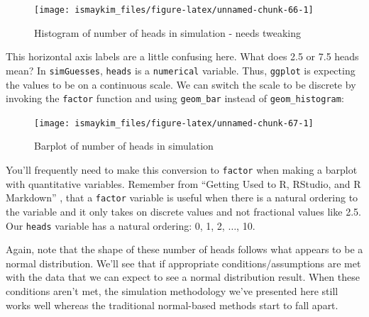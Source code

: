\documentclass[]{tufte-book}
\newenvironment{Shaded}{\begin{snugshade}}{\end{snugshade}}
\newcommand{\KeywordTok}[1]{\textcolor[rgb]{0.13,0.29,0.53}{\textbf{{#1}}}}
\newcommand{\DataTypeTok}[1]{\textcolor[rgb]{0.13,0.29,0.53}{{#1}}}
\newcommand{\StringTok}[1]{\textcolor[rgb]{0.31,0.60,0.02}{{#1}}}
\newcommand{\NormalTok}[1]{{#1}}
\begin{document}
\begin{figure}

{\centering \texttt{[image: ismaykim\_files/figure-latex/unnamed-chunk-66-1]} 

}

\caption[Histogram of number of heads in simulation - needs tweaking]{Histogram of number of heads in simulation - needs tweaking}\label{fig:unnamed-chunk-66}
\end{figure}

This horizontal axis labels are a little confusing here. What does 2.5
or 7.5 heads mean? In \texttt{simGuesses}, \texttt{heads} is a
\texttt{numerical} variable. Thus, \texttt{ggplot} is expecting the
values to be on a continuous scale. We can switch the scale to be
discrete by invoking the \texttt{factor} function and using
\texttt{geom\_bar} instead of \texttt{geom\_histogram}:

\begin{Shaded}
\end{Shaded}

\begin{figure}

{\centering \texttt{[image: ismaykim\_files/figure-latex/unnamed-chunk-67-1]} 

}

\caption[Barplot of number of heads in simulation]{Barplot of number of heads in simulation}\label{fig:unnamed-chunk-67}
\end{figure}

You'll frequently need to make this conversion to \texttt{factor} when
making a barplot with quantitative variables. Remember from ``Getting
Used to R, RStudio, and R Markdown'' \citep{usedtor2016}, that a
\texttt{factor} variable is useful when there is a natural ordering to
the variable and it only takes on discrete values and not fractional
values like 2.5. Our \texttt{heads} variable has a natural ordering: 0,
1, 2, \(\ldots\), 10.

Again, note that the shape of these number of heads follows what appears
to be a normal distribution. We'll see that if appropriate
conditions/assumptions are met with the data that we can expect to see a
normal distribution result. When these conditions aren't met, the
simulation methodology we've presented here still works well whereas the
traditional normal-based methods start to fall apart.
\end{document}
